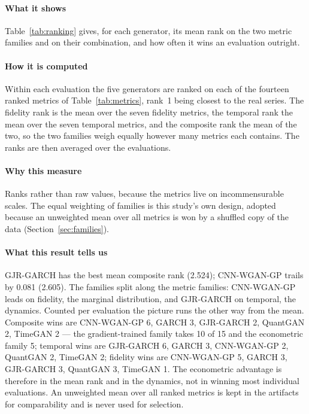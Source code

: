 \documentclass[11pt,a4paper]{article}
\makeatletter
\DeclareRobustCommand{\_}{\ifmmode\nfss@text{\textunderscore}\else\textunderscore\allowbreak\fi}
\makeatother
\begin{document}
\paragraph{What it shows} Table~\ref{tab:ranking} gives, for each generator, its mean rank on the two metric families and on their combination, and how often it wins an evaluation outright.

\paragraph{How it is computed} Within each evaluation the five generators are ranked on each of the fourteen ranked metrics of Table~\ref{tab:metrics}, rank~1 being closest to the real series. The fidelity rank is the mean over the seven fidelity metrics, the temporal rank the mean over the seven temporal metrics, and the composite rank the mean of the two, so the two families weigh equally however many metrics each contains. The ranks are then averaged over the evaluations.

\paragraph{Why this measure} Ranks rather than raw values, because the metrics live on incommensurable scales. The equal weighting of families is this study's own design, adopted because an unweighted mean over all metrics is won by a shuffled copy of the data (Section~\ref{sec:families}).

\paragraph{What this result tells us} GJR-GARCH has the best mean composite rank (2.524); CNN-WGAN-GP trails by 0.081 (2.605). The families split along the metric families: CNN-WGAN-GP leads on fidelity, the marginal distribution, and GJR-GARCH on temporal, the dynamics. Counted per evaluation the picture runs the other way from the mean. Composite wins are CNN-WGAN-GP 6, GARCH 3, GJR-GARCH 2, QuantGAN 2, TimeGAN 2 --- the gradient-trained family takes 10 of 15 and the econometric family 5; temporal wins are GJR-GARCH 6, GARCH 3, CNN-WGAN-GP 2, QuantGAN 2, TimeGAN 2; fidelity wins are CNN-WGAN-GP 5, GARCH 3, GJR-GARCH 3, QuantGAN 3, TimeGAN 1. The econometric advantage is therefore in the mean rank and in the dynamics, not in winning most individual evaluations. An unweighted mean over all ranked metrics is kept in the artifacts for comparability and is never used for selection.
\end{document}
